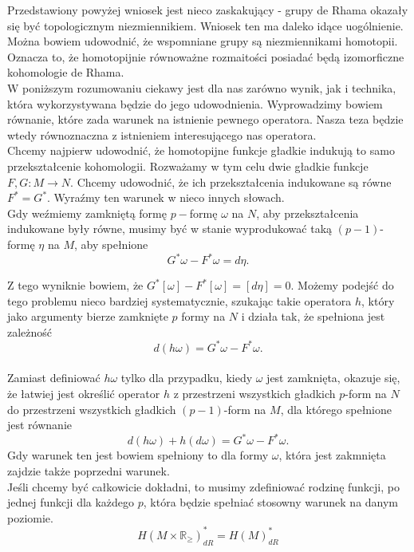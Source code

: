\documentclass[licencjacka]{pracamgr}
\theoremstyle{definition}
\theoremstyle{definition}
\theoremstyle{plain}
\theoremstyle{plain}
\begin{document}

Przedstawiony powyżej wniosek jest nieco zaskakujący - grupy de Rhama okazały
się być topologicznym niezmiennikiem. Wniosek ten ma daleko idące uogólnienie.
Można bowiem udowodnić, że wspomniane grupy są niezmiennikami homotopii. Oznacza
to, że homotopijnie równoważne rozmaitości posiadać będą izomorficzne kohomologie
de Rhama. \\

W poniższym rozumowaniu ciekawy jest dla nas zarówno wynik, jak i technika, która
wykorzystywana będzie do jego udowodnienia. Wyprowadzimy bowiem równanie, które
zada warunek na istnienie pewnego operatora. Nasza teza będzie wtedy równoznaczna
z istnieniem interesującego nas operatora. \\

Chcemy najpierw udowodnić, że homotopijne funkcje gładkie indukują to samo 
przekształcenie kohomologii.
Rozważamy w tym celu dwie gładkie funkcje $F, G: M \rightarrow N$.
Chcemy udowodnić, że ich przekształcenia indukowane są równe
$F^\ast = G^\ast$. Wyraźmy ten warunek w nieco innych słowach. \\

Gdy weźmiemy zamkniętą formę $p-$formę $\omega$ na $N$, aby
przekształcenia indukowane były równe, musimy być w stanie
wyprodukować taką $(p-1)$-formę $\eta$ na $M$, aby spełnione
\[
    G^\ast \omega - F^\ast \omega = d\eta.
\]

Z tego wyniknie bowiem, że
$ G^\ast [\omega] - F^\ast [\omega] =
[d\eta] = 0$.
Możemy podejść do tego problemu nieco bardziej systematycznie, 
szukając takie operatora
$h$, który jako argumenty bierze zamknięte $p$ formy na $N$
i działa tak, że spełniona jest zależność
\[
    d(h\omega) = G^\ast \omega - F^\ast \omega.
\] \\

Zamiast definiować $h \omega$ tylko dla przypadku, kiedy $\omega$
jest zamknięta, okazuje się, że łatwiej jest określić operator
$h$ z przestrzeni wszystkich gładkich $p$-form na $N$
do przestrzeni wszystkich gładkich $(p-1)$-form na $M$,
dla którego spełnione jest równanie
\[
    d(h\omega) + h(d\omega) = G^\ast \omega - F^\ast \omega.
\]
Gdy warunek ten jest bowiem spełniony to dla formy $\omega$, która
jest zakmnięta zajdzie także poprzedni warunek. \\

Jeśli chcemy być całkowicie dokładni, to musimy
zdefiniować rodzinę funkcji, po jednej funkcji dla każdego $p$, która
będzie spełniać stosowny warunek na danym poziomie.
\[
    H(M \times \mathbb{R}_{\geq})_{dR}^\ast = H(M)_{dR}^\ast
\] \\
\end{document}
